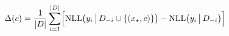 \documentclass[border=2pt]{standalone}
\begin{document}
$\displaystyle \Delta(c)=\frac{1}{|D|}\sum_{i=1}^{|D|}\Bigl[\mathrm{NLL}\bigl(y_i\,\big|\,D_{-i}\cup\{(x_\star,c)\}\bigr)-\mathrm{NLL}\bigl(y_i\,\big|\,D_{-i}\bigr)\Bigr]$
\end{document}
